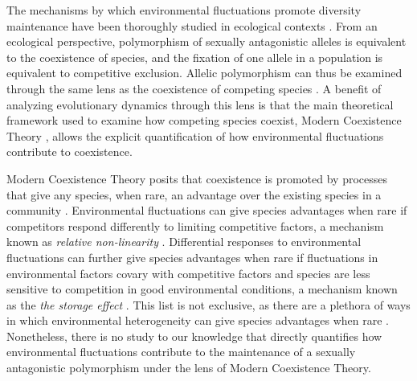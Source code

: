 \documentclass[12pt]{article}
\begin{document}
The mechanisms by which environmental fluctuations promote diversity maintenance have been thoroughly studied in ecological contexts \citep{levins1979coexistence,armstrong1980competitive,chesson2000general,barabas_chessons_2018}. From an ecological perspective, polymorphism of sexually antagonistic alleles is equivalent to the coexistence of species, and the fixation of one allele in a population is equivalent to competitive exclusion. Allelic polymorphism can thus be examined through the same lens as the coexistence of competing species \citep{ellner1994role,ellner1996patterns,dean2005protecting,schreiber2010interactive}. A benefit of analyzing evolutionary dynamics through this lens is that the main theoretical framework used to examine how competing species coexist, Modern Coexistence Theory \citep{Chesson2000, barabas_chessons_2018}, allows the explicit quantification of how environmental fluctuations contribute to coexistence.

Modern Coexistence Theory posits that coexistence is promoted by processes that give any species, when rare, an advantage over the existing species in a community \citep{chesson1994multispecies,Chesson2000}. Environmental fluctuations can give species advantages when rare if competitors respond differently to limiting competitive factors, a mechanism known as \textit{relative non-linearity} \citep{chesson2000general,ellner2016quantify,zepeda2019fluctuation}. Differential responses to environmental fluctuations can further give species advantages when rare if fluctuations in environmental factors covary with competitive factors and species are less sensitive to competition in good environmental conditions, a mechanism known as the \textit{the storage effect} \citep{Chesson2000,ellner2016quantify,barabas_chessons_2018,schreiber2021positively}. This list is not exclusive, as there are a plethora of ways in which environmental heterogeneity can give species advantages when rare \citep{ellner_expanded_2019}. Nonetheless, there is no study to our knowledge that directly quantifies how environmental fluctuations contribute to the maintenance of a sexually antagonistic polymorphism under the lens of Modern Coexistence Theory.

\end{document}
